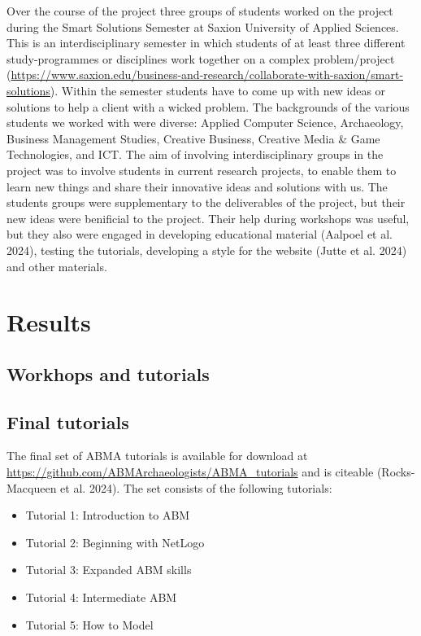 \documentclass[
]{article}
\begin{document}
Over the course of the project three groups of students worked on the project during the Smart Solutions Semester at Saxion University of Applied Sciences. This is an interdisciplinary semester in which students of at least three different study-programmes or disciplines work together on a complex problem/project (\url{https://www.saxion.edu/business-and-research/collaborate-with-saxion/smart-solutions}). Within the semester students have to come up with new ideas or solutions to help a client with a wicked problem. The backgrounds of the various students we worked with were diverse: Applied Computer Science, Archaeology, Business Management Studies, Creative Business, Creative Media \& Game Technologies, and ICT. The aim of involving interdisciplinary groups in the project was to involve students in current research projects, to enable them to learn new things and share their innovative ideas and solutions with us. The students groups were supplementary to the deliverables of the project, but their new ideas were benificial to the project. Their help during workshops was useful, but they also were engaged in developing educational material (Aalpoel et al. 2024), testing the tutorials, developing a style for the website (Jutte et al. 2024) and other materials.

\hypertarget{results}{%
\section{Results}\label{results}}

\hypertarget{workhops-and-tutorials}{%
\subsection{Workhops and tutorials}\label{workhops-and-tutorials}}

\hypertarget{final-tutorials}{%
\subsection{Final tutorials}\label{final-tutorials}}

The final set of ABMA tutorials is available for download at \url{https://github.com/ABMArchaeologists/ABMA_tutorials} and is citeable (Rocks-Macqueen et al. 2024). The set consists of the following tutorials:

\begin{itemize}
\item
  Tutorial 1: Introduction to ABM
\item
  Tutorial 2: Beginning with NetLogo
\item
  Tutorial 3: Expanded ABM skills
\item
  Tutorial 4: Intermediate ABM
\item
  Tutorial 5: How to Model
\end{itemize}
\end{document}
